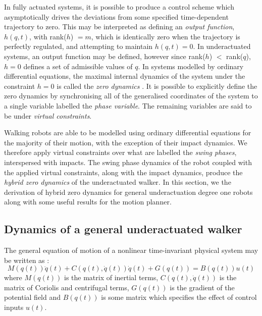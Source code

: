 In fully actuated systems, it is possible to produce a control scheme which asymptotically drives the deviations from some specified time-dependent trajectory to zero. This may be interpreted as defining an \textit{output function}, $h(q,t)$, with rank($h$) $= m$, which is identically zero when the trajectory is perfectly regulated, and attempting to maintain $h(q,t) = 0$. In underactuated systems, an output function may be defined, however since rank($h$) $<$ rank($q$), $h = 0$ defines a set of admissible values of $q$. In systems modelled by ordinary differential equations, the maximal internal dynamics of the system under the constraint $h=0$ is called the \textit{zero dynamics} \cite{isidori1995nonlinear}. It is possible to explicitly define the zero dynamics by synchronising all of the generalised coordinates of the system to a single variable labelled the \textit{phase variable}. The remaining variables are said to be under \textit{virtual constraints}.

Walking robots are able to be modelled using ordinary differential equations for the majority of their motion, with the exception of their impact dynamics. We therefore apply virtual constraints over what are labelled the \textit{swing phases}, interspersed with impacts. The swing phase dynamics of the robot coupled with the applied virtual constraints, along with the impact dynamics, produce the \textit{hybrid zero dynamics} of the underactuated walker. In this section, we the derivation of hybrid zero dynamics for general underactuation degree one robots along with some useful results for the motion planner.

\subsection{Dynamics of a general underactuated walker}
The general equation of motion of a nonlinear time-invariant physical system may be written as \cite{??}:
\begin{equation}\label{eqn:dynamics}
	M\left(q(t)\right)\ddot{q}(t) + C\left(q(t),\dot{q}(t)\right)\dot{q}(t)
	 + G\left(q(t)\right) = B\left(q(t)\right)u(t)
\end{equation}
where $M\left(q(t)\right)$ is the matrix of inertial terms, $C\left(q(t),\dot{q}(t)\right)$ is the matrix of Coriolis and centrifugal terms, $G\left(q(t)\right)$ is the gradient of the potential field and $B\left(q(t)\right)$ is some matrix which specifies the effect of control inputs $u(t)$. 

